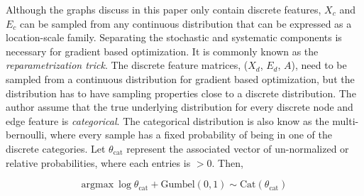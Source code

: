 \documentclass[
  11pt,
  letterpaper,
]{article}
\begin{document}
\quad Although the graphs discuss in this paper only contain discrete
features, \(X_c\) and \(E_c\) can be sampled from any continuous
distribution that can be expressed as a location-scale family.
Separating the stochastic and systematic components is necessary for
gradient based optimization. It is commonly known as the
\emph{reparametrization trick}. The discrete feature matrices, (\(X_d\),
\(E_d\), \(A\)), need to be sampled from a continuous distribution for
gradient based optimization, but the distribution has to have sampling
properties close to a discrete distribution. The author assume that the
true underlying distribution for every discrete node and edge feature is
\emph{categorical}. The categorical distribution is also know as the
multi-bernoulli, where every sample has a fixed probability of being in
one of the discrete categories. Let \(\theta_\text{cat}\) represent the
associated vector of un-normalized or relative probabilities, where each
entries is \(>0\). Then,

\begin{equation} \label{gumbel-max-eq}
    \text{argmax} \ \log \theta_\text{cat} + \text{Gumbel}(0, 1)
        \sim \text{Cat}(\theta_\text{cat})
\end{equation}
\end{document}
